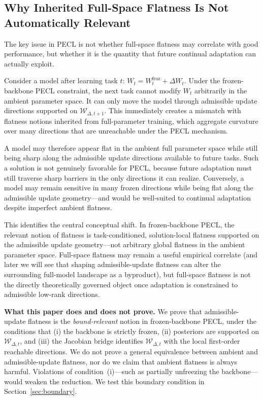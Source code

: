 \subsection{Why Inherited Full-Space Flatness Is Not Automatically Relevant}
\label{sec:why-subspace}

The key issue in PECL is not whether full-space flatness may correlate with good performance, but whether it is the quantity that future continual adaptation can actually exploit.

Consider a model after learning task $t$: $W_t = W_t^{\mathrm{froz}} + \Delta W_t$.
Under the frozen-backbone PECL constraint, the next task cannot modify $W_t$ arbitrarily in the ambient parameter space.
It can only move the model through admissible update directions supported on $\mathcal{W}_{\Delta,t+1}$.
This immediately creates a mismatch with flatness notions inherited from full-parameter training, which aggregate curvature over many directions that are unreachable under the PECL mechanism.

A model may therefore appear flat in the ambient full parameter space while still being sharp along the admissible update directions available to future tasks.
Such a solution is not genuinely favorable for PECL, because future adaptation must still traverse sharp barriers in the only directions it can realize.
Conversely, a model may remain sensitive in many frozen directions while being flat along the admissible update geometry---and would be well-suited to continual adaptation despite imperfect ambient flatness.

This identifies the central conceptual shift.
In frozen-backbone PECL, the relevant notion of flatness is task-conditioned, solution-local flatness supported on the admissible update geometry---not arbitrary global flatness in the ambient parameter space.
Full-space flatness may remain a useful empirical correlate (and later we will see that shaping admissible-update flatness can alter the surrounding full-model landscape as a byproduct), but full-space flatness is not the directly theoretically governed object once adaptation is constrained to admissible low-rank directions.

\textbf{What this paper does and does not prove.}
We prove that admissible-update flatness is the \emph{bound-relevant} notion in frozen-backbone PECL, under the conditions that (i) the backbone is strictly frozen, (ii) posteriors are supported on $\mathcal{W}_{\Delta,t}$, and (iii) the Jacobian bridge identifies $\mathcal{W}_{\Delta,t}$ with the local first-order reachable directions.
We do not prove a general equivalence between ambient and admissible-update flatness, nor do we claim that ambient flatness is always harmful.
Violations of condition~(i)---such as partially unfreezing the backbone---would weaken the reduction.
We test this boundary condition in Section~\ref{sec:boundary}.

